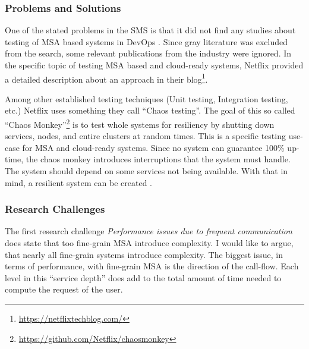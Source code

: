 \subsubsection{Problems and Solutions}

One of the stated problems in the SMS is that it did not find
any studies about testing of MSA based systems in DevOps \cite{waseem:SMSMSADevOps}.
Since gray literature was excluded from the search, some relevant
publications from the industry were ignored. In the specific topic
of testing MSA based and cloud-ready systems, Netflix provided
a detailed description about an approach in their
blog\footnote{\url{https://netflixtechblog.com/}}.

Among other established testing techniques (Unit testing, Integration testing, etc.)
Netflix uses something they call ``Chaos testing''. The goal of this
so called ``Chaos Monkey''\footnote{\url{https://github.com/Netflix/chaosmonkey}}
is to test whole systems for resiliency by shutting down services,
nodes, and entire clusters at random times. This is a specific testing use-case
for MSA and cloud-ready systems. Since no system can guarantee 100\% up-time,
the chaos monkey introduces interruptions that the system must handle.
The system should depend on some services not being available. With that
in mind, a resilient system can be created \cite{netflix:SimianArmy,basiri:ChaosEngineering}.

\subsubsection{Research Challenges}

The first research challenge \textit{Performance issues
due to frequent communication} does state that too fine-grain
MSA introduce complexity. I would like to argue, that nearly
all fine-grain systems introduce complexity. The biggest issue, in terms of performance,
with fine-grain MSA is the direction of the call-flow.
Each level in this ``service depth'' does add to the total amount of
time needed to compute the request of the user.

